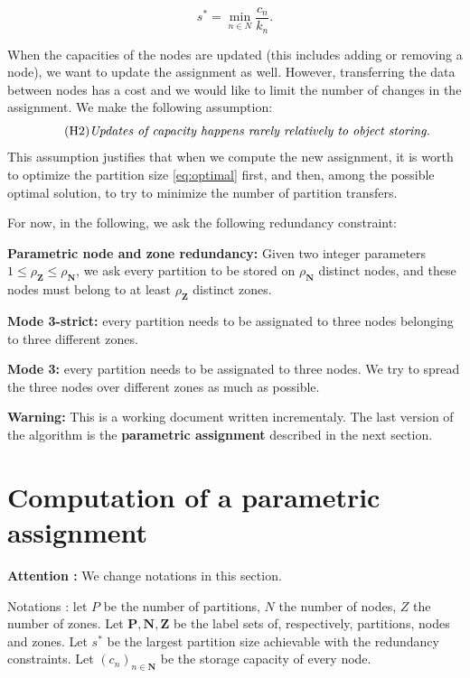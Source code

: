 \documentclass[]{article}
\begin{document}
\begin{equation}
	\label{eq:optimal}
	\tag{OPT}
s^* = \min_{n \in N} \frac{c_n}{k_n}.
\end{equation}

When the capacities of the nodes are updated (this includes adding or removing a node), we want to update the assignment as well. However, transferring the data between nodes has a cost and we would like to limit the number of changes in the assignment. We make the following assumption:
\begin{equation}
	\tag{H2}
	\text{\emph{Updates of capacity happens rarely relatively to object storing.}}
\end{equation}
This assumption justifies that when we compute the new assignment, it is worth to optimize the partition size \eqref{eq:optimal} first, and then, among the possible optimal solution, to try to minimize the number of partition transfers.

For now, in the following, we ask the following redundancy constraint:

\textbf{Parametric node and zone redundancy:} Given two integer parameters $1\le \rho_\mathbf{Z} \le \rho_\mathbf{N}$, we ask every partition to be stored on $\rho_\mathbf{N}$ distinct nodes, and these nodes must belong to at least $\rho_\mathbf{Z}$ distinct zones.


\textbf{Mode 3-strict:}  every partition needs to be assignated to three nodes belonging to three different zones.

\textbf{Mode 3:} every partition needs to be assignated to three nodes. We try to spread the three nodes over different zones as much as possible.

\textbf{Warning:} This is a working document written incrementaly. The last version of the algorithm is the \textbf{parametric assignment} described in the next section.


\section{Computation of a parametric assignment}
\textbf{Attention : }We change notations in this section.

Notations : let $P$ be the number of partitions, $N$ the number of nodes, $Z$ the number of zones. Let $\mathbf{P,N,Z}$ be the label sets of, respectively, partitions, nodes and zones.
Let $s^*$ be the largest partition size achievable with the redundancy constraints. Let $(c_n)_{n\in \mathbf{N}}$ be the storage capacity of every node. 
\end{document}
